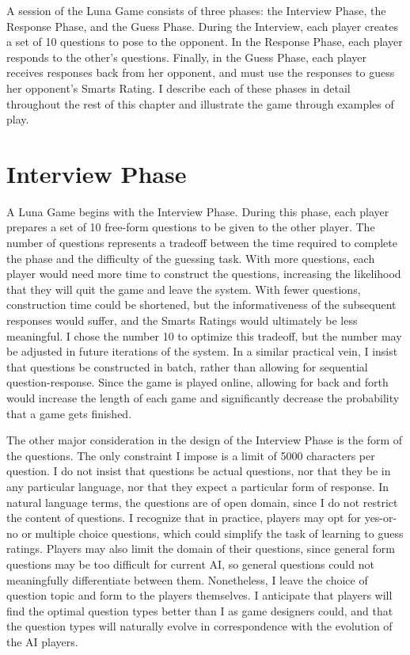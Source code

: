 A session of the Luna Game consists of three phases: the Interview Phase, the Response Phase, and the Guess Phase. During the Interview, each player creates a set of 10 questions to pose to the opponent. In the Response Phase, each player responds to the other's questions. Finally, in the Guess Phase, each player receives responses back from her opponent, and must use the responses to guess her opponent's Smarts Rating. I describe each of these phases in detail throughout the rest of this chapter and illustrate the game through examples of play.

\section{Interview Phase}

A Luna Game begins with the Interview Phase. During this phase, each player prepares a set of 10 free-form questions to be given to the other player. The number of questions represents a tradeoff between the time required to complete the phase and the difficulty of the guessing task. With more questions, each player would need more time to construct the questions, increasing the likelihood that they will quit the game and leave the system. With fewer questions, construction time could be shortened, but the informativeness of the subsequent responses would suffer, and the Smarts Ratings would ultimately be less meaningful. I chose the number 10 to optimize this tradeoff, but the number may be adjusted in future iterations of the system. In a similar practical vein, I insist that questions be constructed in batch, rather than allowing for sequential question-response. Since the game is played online, allowing for back and forth would increase the length of each game and significantly decrease the probability that a game gets finished.

The other major consideration in the design of the Interview Phase is the form of the questions. The only constraint I impose is a limit of 5000 characters per question. I do not insist that questions be actual questions, nor that they be in any particular language, nor that they expect a particular form of response. In natural language terms, the questions are of open domain, since I do not restrict the content of questions. I recognize that in practice, players may opt for yes-or-no or multiple choice questions, which could simplify the task of learning to guess ratings. Players may also limit the domain of their questions, since general form questions may be too difficult for current AI, so general questions could not meaningfully differentiate between them. Nonetheless, I leave the choice of question topic and form to the players themselves. I anticipate that players will find the optimal question types better than I as game designers could, and that the question types will naturally evolve in correspondence with the evolution of the AI players.

